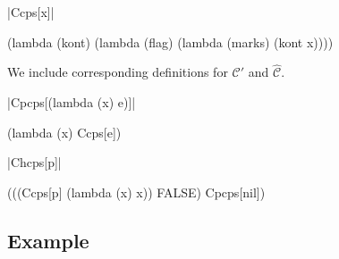 \documentclass{llncs}
\begin{document}
\begin{schemedefn}{\scheme|Ccps[x]|}
\begin{schemedisplay}
(lambda (kont)
  (lambda (flag)
    (lambda (marks)
      (kont x))))
\end{schemedisplay}
\end{schemedefn}

We include corresponding definitions for $\mathcal{C}'$ and $\hat{\mathcal{C}}$.

\begin{schemedefn}{\scheme|Cpcps[(lambda (x) e)]|}
\begin{schemedisplay}
(lambda (x) Ccps[e])
\end{schemedisplay}
\end{schemedefn}

\begin{schemedefn}{\scheme|Chcps[p]|}
\begin{schemedisplay}
(((Ccps[p] (lambda (x) x)) FALSE) Cpcps[nil])
\end{schemedisplay}
\end{schemedefn}

\subsection{Example}
\end{document}
